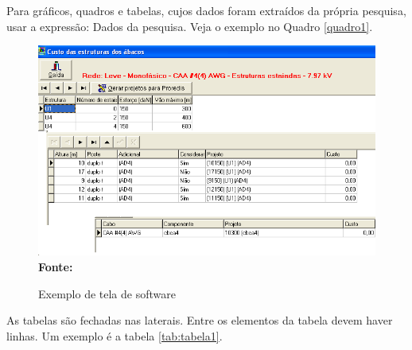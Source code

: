 Para gráficos, quadros e tabelas, cujos dados foram extraídos da própria pesquisa, 
usar a expressão: Dados da pesquisa. Veja o exemplo no Quadro \ref{quadro1}.

\begin{figure}[ht]
	\centering	
	\caption[\hspace{0.1cm}Exemplo de tela de software.]{Exemplo de tela de software}
	  \vspace{-0.2cm}
	\includegraphics[width=.9\textwidth]{figuras/tela1.png}
	 \vspace{-0.1cm}
	\\\textbf{\footnotesize Fonte: \cite{tela1}}
	\label{fig:tela1}
\end{figure}


As tabelas são fechadas nas laterais. Entre os elementos da tabela devem haver linhas. Um exemplo é a tabela \ref{tab:tabela1}. 

